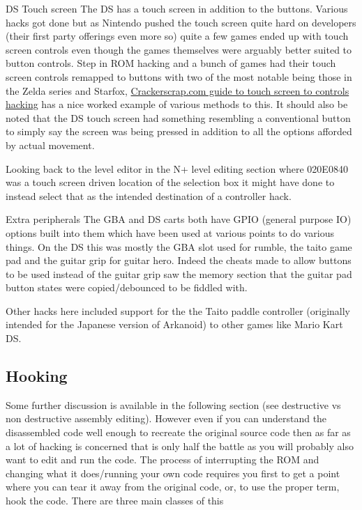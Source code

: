 \documentclass[
]{book}
\begin{document}
DS Touch screen The DS has a touch screen in addition to the buttons. Various hacks got done but as Nintendo pushed the touch screen quite hard on developers (their first party offerings even more so) quite a few games ended up with touch screen controls even though the games themselves were arguably better suited to button controls. Step in ROM hacking and a bunch of games had their touch screen controls remapped to buttons with two of the most notable being those in the Zelda series and Starfox, \href{https://web.archive.org/web/20110604163902/http://crackerscrap.com/docs/sfchacktut.html}{Crackerscrap.com guide to touch screen to controls hacking} has a nice worked example of various methods to this. It should also be noted that the DS touch screen had something resembling a conventional button to simply say the screen was being pressed in addition to all the options afforded by actual movement.

Looking back to the level editor in the N+ level editing section where 020E0840 was a touch screen driven location of the selection box it might have done to instead select that as the intended destination of a controller hack.

Extra peripherals The GBA and DS carts both have GPIO (general purpose IO) options built into them which have been used at various points to do various things. On the DS this was mostly the GBA slot used for rumble, the taito game pad and the guitar grip for guitar hero. Indeed the cheats made to allow buttons to be used instead of the guitar grip saw the memory section that the guitar pad button states were copied/debounced to be fiddled with.

Other hacks here included support for the the Taito paddle controller (originally intended for the Japanese version of Arkanoid) to other games like Mario Kart DS.

\hypertarget{hooking}{%
\subsection{Hooking}\label{hooking}}

Some further discussion is available in the following section (see destructive vs non destructive assembly editing). However even if you can understand the disassembled code well enough to recreate the original source code then as far as a lot of hacking is concerned that is only half the battle as you will probably also want to edit and run the code. The process of interrupting the ROM and changing what it does/running your own code requires you first to get a point where you can tear it away from the original code, or, to use the proper term, hook the code. There are three main classes of this
\end{document}
